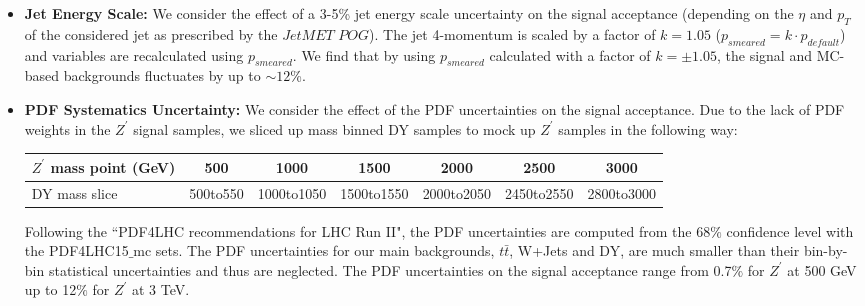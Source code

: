 \begin{itemize}
  \item \textbf{Jet Energy Scale:} We consider the effect of a 3-5\% jet energy scale uncertainty on the signal 
acceptance (depending on the $\eta$ and $p_{T}$ of the considered jet as prescribed by the $JetMET$ $POG$). The jet 
4-momentum is scaled by a factor of $k=1.05$ ($p_{smeared} = k \cdot p_{default}$) and variables are recalculated 
using $p_{smeared}$. We find that by using $p_{smeared}$ calculated with
a factor of $k=\pm 1.05$, the signal and MC-based backgrounds fluctuates by up to $\sim 12$\%. 
%

  \item \textbf{PDF Systematics Uncertainty:} We consider the effect of the PDF uncertainties on the signal acceptance. 
Due to the lack of PDF weights in the $Z^\prime$ signal samples, we sliced up mass binned DY samples to mock up $Z^\prime$ samples in 
the following way:
\begin{table}[htbp!]	
  \begin{tabular}{| l | c | c | c | c | c | c |} 
  \hline\hline 
  $Z^\prime$ mass point (GeV) & 500 & 1000 & 1500 & 2000 & 2500 & 3000\\
  \hline
  DY mass slice & 500to550 & 1000to1050 & 1500to1550 & 2000to2050 & 2450to2550 & 2800to3000\\
  \hline \hline
  \end{tabular}
\end{table}

Following the ``PDF4LHC recommendations for LHC Run
II"\cite{PDF4LHC15}, the PDF uncertainties are computed from the
68$\%$ confidence level with the PDF4LHC15$\_$mc sets. The PDF
uncertainties for our main backgrounds, $t\bar{t}$, W+Jets and DY, are
much smaller than their bin-by-bin statistical uncertainties and thus are
neglected. The PDF uncertainties on the signal acceptance range from
0.7$\%$ for $Z^\prime$ at 500 GeV up to 12$\%$ for $Z^\prime$ at 3 TeV.



\end{itemize}
